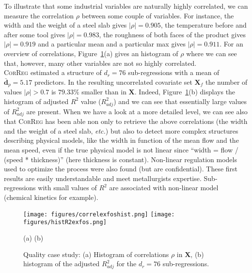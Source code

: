 \documentclass[12pt,a4paper]{report}
\begin{document}
To illustrate that some industrial variables are naturally highly correlated, we can measure the correlation $\rho$ between some couple of variables. For instance, the width and the weight of a steel slab gives $|\rho|=0.905$, the temperature before and after some tool gives $|\rho|=0.983$, the  roughness of both faces of the product gives $|\rho|= 0.919$ and a particular mean and a particular max gives $|\rho|=0.911$. For an overview of correlations, Figure~\ref{fig:graphCorr.quality}(a) gives an histogram of $\rho$ where we can see that, however, many other variables are not so highly correlated.\\

\textsc{CorReg} estimated a structure of $d_r=76$ sub-regressions with a mean of $\bar{\boldsymbol{d}}_p=5.17$ predictors. In the resulting uncorrelated covariate set $\boldsymbol{X}_f$ the number of values $|\rho|>0.7$ is $79.33\%$ smaller than in $\boldsymbol{X}$. Indeed, Figure~\ref{fig:graphCorr.quality}(b) displays the histogram of adjusted $R^2$ value ($R^2_{adj}$) and we can see that essentially large values of $R^2_{adj}$ are present. When we have a look at a more detailed level, we can see also that \textsc{CorReg} has been able non only to retrieve the above correlations (the width and the weight of a steel slab, {\it etc.}) but also to detect more complex structures describing physical models, like the width in function of the mean flow and the mean speed, even if the true physical model is not linear since ``width = flow / (speed * thickness)'' (here thickness is constant). Non-linear regulation models used to optimize the process were also found (but are confidential). These first results are easily understandable and meet metallurgists expertise.  Sub-regressions with small values of $R^2$ are associated with non-linear model (chemical kinetics for example).
		
\begin{figure}[h!]
\begin{center}
			\texttt{[image: figures/correlexfoshist.png]}
			\texttt{[image: figures/histR2exfos.png]}
\end{center}
\vspace{-5mm}
			\centerline{(a) \hspace{180px} (b)}
			\caption{Quality case study: (a) Histogram of correlations $\rho$ in $\boldsymbol{X}$, (b) histogram of the adjusted $R^2_{adj}$ for the $d_r=76$ sub-regressions.}\label{fig:graphCorr.quality}
\end{figure}  			
		
\end{document}
